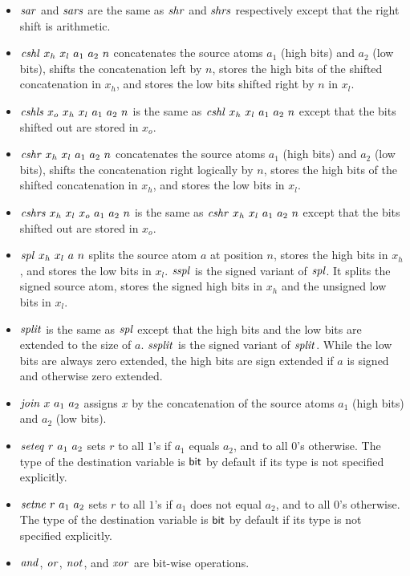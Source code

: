 \documentclass{article}
\begin{document}
\begin{itemize}
  the bits shifted out are stored in $o$.
\item $\mathit{sar}$ and $\mathit{sars}$ are the same as $\mathit{shr}$ and $\mathit{shrs}$
  respectively except that the right shift is arithmetic.
\item $\mathit{cshl}\ x_h\ x_l\ a_1\ a_2\ n$ concatenates the source atoms
  $a_1$ (high bits) and $a_2$ (low bits), shifts the concatenation
  left by $n$, stores the high bits of the shifted concatenation in
  $x_h$, and stores the low bits shifted right by $n$ in $x_l$.
\item $\icshls\ x_o\ x_h\ x_l\ a_1\ a_2\ n$ is the same as $\mathit{cshl}\
  x_h\ x_l\ a_1\ a_2\ n$ except that the bits shifted out are stored
  in $x_o$.
\item $\mathit{cshr}\ x_h\ x_l\ a_1\ a_2\ n$ concatenates the source atoms
  $a_1$ (high bits) and $a_2$ (low bits), shifts the concatenation
  right logically by $n$, stores the high bits of the shifted
  concatenation in $x_h$, and stores the low bits in $x_l$.
\item $\icshrs\ x_h\ x_l\ x_o\ a_1\ a_2\ n$ is the same as $\mathit{cshr}\
  x_h\ x_l\ a_1\ a_2\ n$ except that the bits shifted out are stored
  in $x_o$.
\item $\mathit{spl}\ x_h\ x_l\ a\ n$ splits the source atom $a$ at position
  $n$, stores the high bits in $x_h$, and stores the low bits in
  $x_l$. $\mathit{sspl}$ is the signed variant of $\mathit{spl}$. It splits the
  signed source atom, stores the signed high bits in $x_h$ and the
  unsigned low bits in $x_l$.
\item $\mathit{split}$ is the same as $\mathit{spl}$ except that the high bits and
  the low bits are extended to the size of $a$. $\mathit{ssplit}$ is the
  signed variant of $\mathit{split}$.
  While the low bits are always zero extended, the high bits are sign
  extended if $a$ is signed and otherwise zero extended.
\item $\mathit{join}\ x\ a_1\ a_2$ assigns $x$ by the concatenation of the
  source atoms $a_1$ (high bits) and $a_2$ (low bits).
\item $\mathit{seteq}\ r\ a_1\ a_2$ sets $r$ to all $1$'s if $a_1$ equals
  $a_2$, and to all $0$'s otherwise.
  The type of the destination variable is $\mathsf{bit}$ by default if its
  type is not specified explicitly.
\item $\mathit{setne}\ r\ a_1\ a_2$ sets $r$ to all $1$'s if $a_1$ does not
  equal $a_2$, and to all $0$'s otherwise.
  The type of the destination variable is $\mathsf{bit}$ by default if its
  type is not specified explicitly.
\item $\mathit{and}$, $\mathit{or}$, $\mathit{not}$, and $\mathit{xor}$ are bit-wise operations.

\end{itemize}
\end{document}
